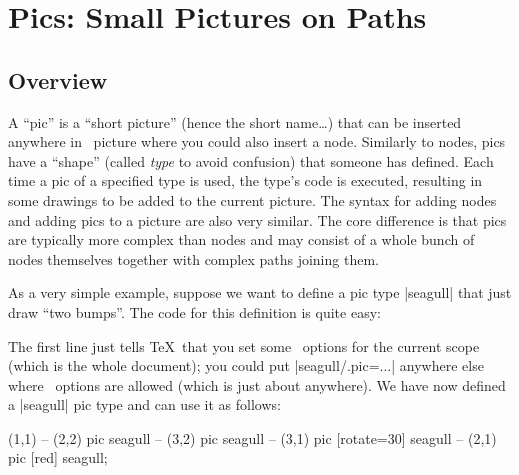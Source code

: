 %
%
%


\section{Pics: Small Pictures on Paths}
\label{section-pics}

\subsection{Overview}

A ``pic'' is a ``short picture'' (hence the short name\dots) that can be
inserted anywhere in \tikzname\ picture where you could also insert a node.
Similarly to nodes, pics have a ``shape'' (called \emph{type} to avoid
confusion) that someone has defined. Each time a pic of a specified type is
used, the type's code is executed, resulting in some drawings to be added to
the current picture. The syntax for adding nodes and adding pics to a picture
are also very similar. The core difference is that pics are typically more
complex than nodes and may consist of a whole bunch of nodes themselves
together with complex paths joining them.

As a very simple example, suppose we want to define a pic type |seagull| that
just draw ``two bumps''. The code for this definition is quite easy:
%
\begin{codeexample}
\end{codeexample}

The first line just tells \TeX\ that you set some \tikzname\ options for the
current scope (which is the whole document); you could put |seagull/.pic=...|
anywhere else where \tikzname\ options are allowed (which is just about
anywhere). We have now defined a |seagull| pic type and can use it as follows:
%
\begin{codeexample}[
    pre={\tikzset{
  seagull/.pic={
    \draw (-3mm,0) to [bend left] (0,0) to [bend left] (3mm,0);
  },
}}]
\tikz \fill [fill=blue!20]
     (1,1)
  -- (2,2) pic             {seagull}
  -- (3,2) pic             {seagull}
  -- (3,1) pic [rotate=30] {seagull}
  -- (2,1) pic [red]       {seagull};
\end{codeexample}

